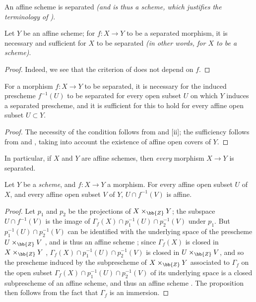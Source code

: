 \begin{corollary}[5.5.7]
\label{I.5.5.7}
An affine scheme is separated \emph{(and is thus a \emph{scheme}, which justifies the terminology of )}.
\end{corollary}

\begin{corollary}[5.5.8]
\label{I.5.5.8}
Let $Y$ be an affine scheme;
for $f:X\to Y$ to be a separated morphism, it is necessary and sufficient for $X$ to be separated \emph{(in other words, for $X$ to be a \emph{scheme})}.
\end{corollary}

\begin{proof}
Indeed, we see that the criterion of  does not depend on $f$.
\end{proof}

\begin{corollary}[5.5.9]
\label{I.5.5.9}
For a morphism $f:X\to Y$ to be separated, it is necessary for the induced prescheme $f^{-1}(U)$ to be separated for every open subset $U$ on which $Y$ induces a separated prescheme, and it is sufficient for this to hold for every affine open subset $U\subset Y$.
\end{corollary}

\begin{proof}
The necessity of the condition follows from  and [ii];
the sufficiency follows from  and , taking into account the existence of affine open covers of $Y$.
\end{proof}

In particular, if $X$ and $Y$ are affine schemes, then \emph{every} morphism $X\to Y$ is separated.

\begin{proposition}[5.5.10]
\label{I.5.5.10}
Let $Y$ be a \emph{scheme}, and $f:X\to Y$ a morphism.
For every affine open subset $U$ of $X$, and every affine open subset $V$ of $Y$, $U\cap f^{-1}(V)$ is affine.
\end{proposition}

\begin{proof}
Let $p_1$ and $p_2$ be the projections of $X\times_\bb{Z}Y$;
the subspace $U\cap f^{-1}(V)$ is the image of $\Gamma_f(X)\cap p_1^{-1}(U)\cap p_2^{-1}(V)$ under $p_1$.
But $p_1^{-1}(U)\cap p_2^{-1}(V)$ can be identified with the underlying space of the
prescheme $U\times_\bb{Z}V$ , and is thus an affine scheme ;
since $\Gamma_f(X)$ is closed in $X\times_\bb{Z}Y$ , $\Gamma_f(X)\cap p_1^{-1}(U)\cap p_2^{-1}(V)$ is closed in $U\times_\bb{Z} V$, and so the prescheme induced by the subprescheme of $X\times_\bb{Z}Y$ associated to $\Gamma_f$  on the open subset $\Gamma_f(X)\cap p_1^{-1}(U)\cap p_2^{-1}(V)$ of its underlying space is a closed subprescheme of an affine scheme, and thus an affine scheme .
The proposition then follows from the fact that $\Gamma_f$ is an immersion.
\end{proof}

